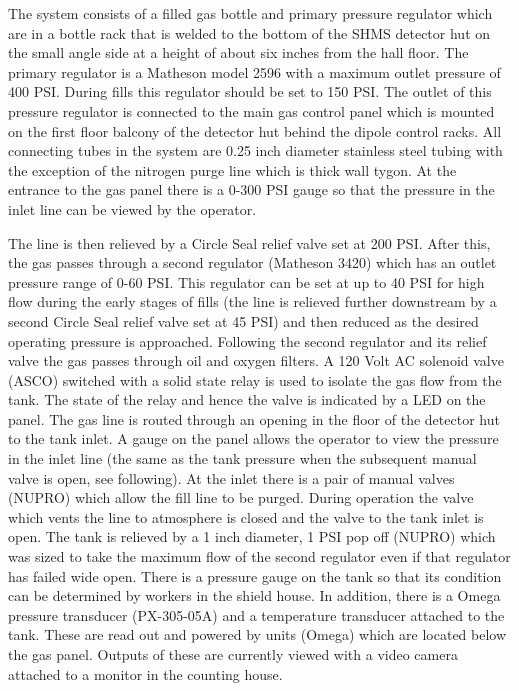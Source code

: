 { \color{red}  

The system consists of a filled gas bottle and primary pressure
regulator which are in a bottle rack that is welded to the bottom of
the SHMS detector hut on the small angle side at a height of about six
inches from the hall floor. The primary regulator is a Matheson model
2596 with a maximum outlet pressure of 400 PSI.  During fills this
regulator should be set to 150 PSI. The outlet of this pressure
regulator is connected to the main gas control panel which is mounted
on the first floor balcony of the detector hut behind the dipole
control racks. All connecting tubes in the system are 0.25 inch
diameter stainless steel tubing with the exception of the nitrogen
purge line which is thick wall tygon. At the entrance to the gas panel
there is a 0-300 PSI gauge so that the pressure in the inlet line can
be viewed by the operator.


The line is then relieved by a Circle Seal relief valve set at 200 PSI.
After this, the gas passes through a second regulator (Matheson 3420)
which has an outlet pressure range of 0-60 PSI. This regulator can be set at
up to 40 PSI for high flow during the early stages of fills
(the line is relieved further downstream by a second
Circle Seal relief valve set at 45 PSI) and then reduced as
the desired operating pressure is approached. Following the second regulator
and its relief valve the gas passes through oil and oxygen filters.
A 120 Volt AC solenoid valve (ASCO) switched with a solid state
relay is used to isolate the gas flow from the tank. The state of
the relay and hence the valve is indicated by a LED on the panel.
The gas line is routed through an opening in the floor of the detector hut
to the tank inlet. A gauge on the panel allows the operator to view
the pressure in the inlet line (the same as the tank pressure
when the subsequent manual valve is open, see following).
At the inlet there is a pair of manual valves (NUPRO)
which allow the fill line to be purged.
During operation the valve which vents the
line to atmosphere is closed and the valve to the tank inlet is open.
The tank is relieved by a 1 inch diameter, 1 PSI pop off (NUPRO) which was
sized to take the
maximum flow of the second regulator even if that regulator has failed
wide open. There is a pressure gauge on the tank so that its condition
can be determined by workers in the shield house. In addition,
there is a Omega pressure transducer (PX-305-05A) and a temperature
transducer attached to the tank. These are read out and powered by
units (Omega) which are located below the gas panel.  Outputs of these
are currently viewed with a video camera attached
to a monitor in the counting house.

}
